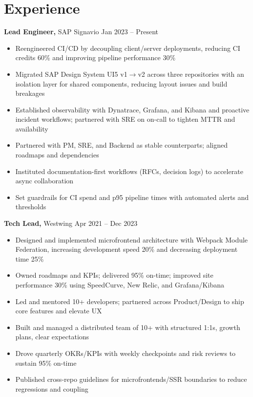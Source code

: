 \documentclass[11pt]{article}       %
\begin{document}
\section*{Experience}
\textbf{Lead Engineer,} SAP Signavio \hfill Jan 2023 -- Present \\
\vspace{-9pt}
\begin{itemize}
  \item Reengineered CI/CD by decoupling client/server deployments, reducing CI credits 60\% and improving pipeline performance 30\%
  \item Migrated SAP Design System UI5 v1$\to$v2 across three repositories with an isolation layer for shared components, reducing layout issues and build breakages
  \item Established observability with Dynatrace, Grafana, and Kibana and proactive incident workflows; partnered with SRE on on-call to tighten MTTR and availability
  \item Partnered with PM, SRE, and Backend as stable counterparts; aligned roadmaps and dependencies
  \item Instituted documentation-first workflows (RFCs, decision logs) to accelerate async collaboration
  \item Set guardrails for CI spend and p95 pipeline times with automated alerts and thresholds
\end{itemize}

\textbf{Tech Lead,} Westwing \hfill Apr 2021 -- Dec 2023 \\
\vspace{-9pt}
\begin{itemize}
  \item Designed and implemented microfrontend architecture with Webpack Module Federation, increasing development speed 20\% and decreasing deployment time 25\%
  \item Owned roadmaps and KPIs; delivered 95\% on-time; improved site performance 30\% using SpeedCurve, New Relic, and Grafana/Kibana
  \item Led and mentored 10+ developers; partnered across Product/Design to ship core features and elevate UX
  \item Built and managed a distributed team of 10+ with structured 1:1s, growth plans, clear expectations
  \item Drove quarterly OKRs/KPIs with weekly checkpoints and risk reviews to sustain 95\% on-time
  \item Published cross-repo guidelines for microfrontends/SSR boundaries to reduce regressions and coupling
\end{itemize}
\end{document}
